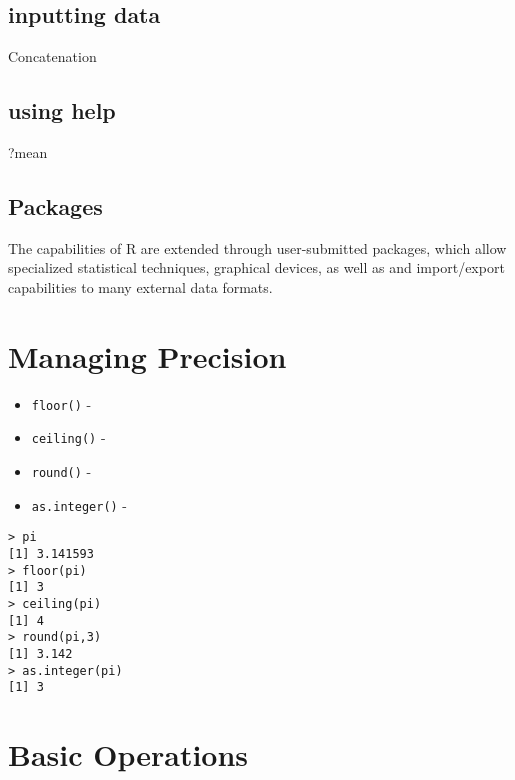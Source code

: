 \documentclass[a4paper,12pt]{article}
\begin{document}


\subsection{inputting data}
 Concatenation

\subsection{using help}

?mean


\subsection{Packages}
The capabilities of R are extended through user-submitted packages, which allow specialized statistical techniques, graphical devices, as well as and
import/export capabilities to many external data formats.

\section{Managing Precision}
\begin{itemize}
\item \texttt{floor()} - 
\item \texttt{ceiling()} - 
\item \texttt{round()} - 
\item \texttt{as.integer()} -
\end{itemize}

\footnotesize
\begin{myindentpar}{1cm}
\begin{verbatim}
> pi
[1] 3.141593
> floor(pi)
[1] 3
> ceiling(pi)
[1] 4
> round(pi,3)
[1] 3.142
> as.integer(pi)
[1] 3
\end{verbatim}
\end{myindentpar}
\normalsize

\section{Basic Operations}
\end{document}
